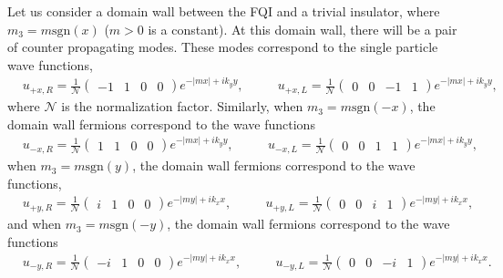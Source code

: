 \documentclass[%
 reprint,
 amsmath,amssymb,
 aps,
]{revtex4-1}
\begin{document}
\begin{appendix}
Let us consider a domain wall between the FQI and a trivial insulator, where $m_3 = m\text{sgn}(x)$ ($m>0$ is a constant). At this domain wall, there will be a pair of counter propagating modes. These modes correspond to the single particle wave functions, 
\begin{equation}\begin{split}
&u_{+x,R} = \tfrac{1}{\mathcal{N}} \begin{pmatrix} -1&1&0&0 \end{pmatrix} e^{- |m x|+ i k_y y}, \phantom{==}u_{+x,L} = \tfrac{1}{\mathcal{N}}  \begin{pmatrix} 0&0&-1&1 \end{pmatrix} e^{- |m x| + i k_y y},
\label{Aeq:DWFermionsXFrac}\end{split}\end{equation}
where $\mathcal{N}$ is the normalization factor. Similarly, when $m_3 = m\text{sgn}(-x)$, the domain wall fermions correspond to the wave functions
\begin{equation}\begin{split}
&u_{-x,R} = \tfrac{1}{\mathcal{N}} \begin{pmatrix} 1&1&0&0 \end{pmatrix} e^{- |m x|+ i k_y y}, \phantom{==}u_{-x,L} = \tfrac{1}{\mathcal{N}}  \begin{pmatrix} 0&0&1&1 \end{pmatrix} e^{- |m x| + i k_y y},
\label{Aeq:DWFermionsX2Frac}\end{split}\end{equation}
when $m_3 = m\text{sgn}(y)$, the domain wall fermions correspond to the wave functions,
\begin{equation}\begin{split}
&u_{+y,R}= \tfrac{1}{\mathcal{N}}  \begin{pmatrix} i&1&0&0 \end{pmatrix} e^{- |m y|+ i k_x x}, \phantom{==}u_{+y,L} = \tfrac{1}{\mathcal{N}}  \begin{pmatrix} 0&0&i&1 \end{pmatrix} e^{- |my| + i k_x x},
\label{Aeq:DWFermionsYFrac}\end{split}\end{equation}
and when $m_3 = m\text{sgn}(-y)$, the domain wall fermions correspond to the wave functions
\begin{equation}\begin{split}
&u_{-y,R}= \tfrac{1}{\mathcal{N}}  \begin{pmatrix} -i&1&0&0 \end{pmatrix} e^{- |m y|+ i k_x x}, \phantom{==}u_{-y,L} = \tfrac{1}{\mathcal{N}}  \begin{pmatrix} 0&0&-i&1 \end{pmatrix} e^{- |my| + i k_x x}.

\end{split}
\end{equation}
\end{appendix}
\end{document}
